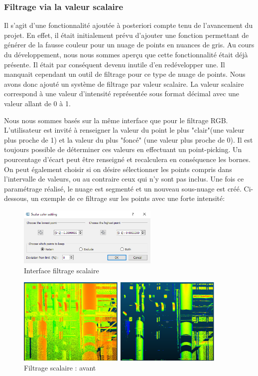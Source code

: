 \documentclass[12pt,titlepage,french]{article}
\begin{document}
\subsubsection{Filtrage via la valeur scalaire}

Il s'agit d'une fonctionnalité ajoutée à posteriori compte tenu de l'avancement du projet. En effet, il était initialement prévu d'ajouter une fonction permettant de générer de la fausse couleur pour un nuage de points en nuances de gris. Au cours du développement, nous nous sommes aperçu que cette fonctionnalité était déjà présente. Il était par conséquent devenu inutile d'en redévelopper une. Il manquait cependant un outil de filtrage pour ce type de nuage de points. Nous avons donc ajouté un système de filtrage par valeur scalaire. La valeur scalaire correspond à une valeur d'intensité représentée sous format décimal avec une valeur allant de 0 à 1. \newline

Nous nous sommes basés sur la même interface que pour le filtrage RGB. L'utilisateur est invité à renseigner la valeur du point le plus "clair"(une valeur plus proche de 1) et la valeur du plus "foncé" (une valeur plus proche de 0). Il est toujours possible de déterminer ces valeurs en effectuant un point-picking. Un pourcentage d'écart peut être renseigné et recalculera en conséquence les bornes. On peut également choisir si on désire sélectionner les points compris dans l'intervalle de valeurs, ou au contraire ceux qui n'y sont pas inclus. Une fois ce paramétrage réalisé, le nuage est segmenté et un nouveau sous-nuage est créé. Ci-dessous, un exemple de ce filtrage sur les points avec une forte intensité:

\begin{figure}[H]
\center \includegraphics[width=0.6\textwidth]{./img/scalar_menu.png}
  \caption{\label{} Interface filtrage scalaire}
\end{figure}

\begin{figure}[H]
\center
\includegraphics[width=0.9\textwidth]{./img/scalaire_avant_apres.png}
\caption{\label{} Filtrage scalaire : avant}
\end{figure}
\end{document}
